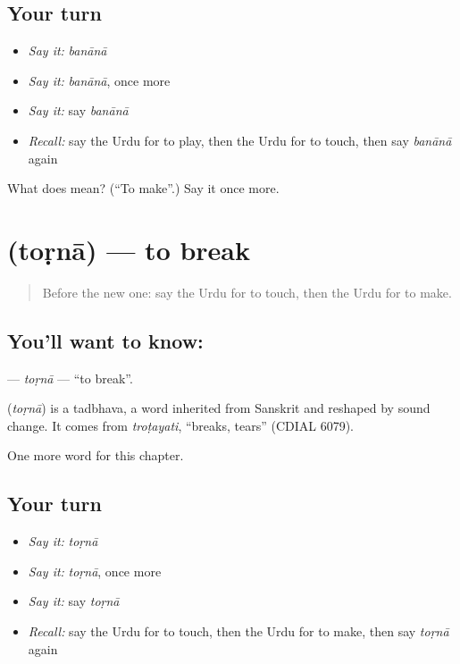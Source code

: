 \subsection*{Your turn}
\begin{itemize}
\raggedright
  \item \emph{Say it:} \emph{banānā}
  \item \emph{Say it:} \emph{banānā}, once more
  \item \emph{Say it:} say \emph{banānā}
  \item \emph{Recall:} say the Urdu for to play, then the Urdu for to touch, then say \emph{banānā} again
\end{itemize}

\begin{tcolorbox}[breakable,colback=teal!4,colframe=teal!35!black,title={Before you move on}]
What does  mean? (\textquotedblleft{}To make\textquotedblright{}.) Say it once more.
\end{tcolorbox}
\section[\texorpdfstring{\ur{توڑنا} (toṛnā)}{توڑنا (toṛnā)}]{ (toṛnā) — to break}

\label{lesson:UR-C139-torna}



\begin{quote}
Before the new one: say the Urdu for to touch, then the Urdu for to make.
\end{quote}

\subsection*{You'll want to know: }
\textbf{} — \emph{toṛnā} — \textquotedblleft{}to break\textquotedblright{}.

\begin{cousinweb}
\textbf{} (\emph{toṛnā}) is a tadbhava, a word inherited from Sanskrit and reshaped by sound change. It comes from \emph{troṭayati}, \textquotedblleft{}breaks, tears\textquotedblright{} (CDIAL 6079).
\end{cousinweb}

\begin{grammarlens}[title={What you've built}]
One more word for this chapter.
\end{grammarlens}

\subsection*{Your turn}
\begin{itemize}
\raggedright
  \item \emph{Say it:} \emph{toṛnā}
  \item \emph{Say it:} \emph{toṛnā}, once more
  \item \emph{Say it:} say \emph{toṛnā}
  \item \emph{Recall:} say the Urdu for to touch, then the Urdu for to make, then say \emph{toṛnā} again
\end{itemize}

